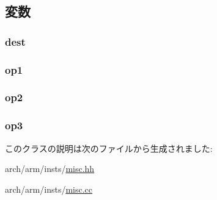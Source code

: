 \subsection{変数}
\hypertarget{classRegRegRegRegOp_aec72e8e45bdc87abeeeb75d2a8a9a716}{
\subsubsection[{dest}]{ {\bf dest}}}
\label{classRegRegRegRegOp_aec72e8e45bdc87abeeeb75d2a8a9a716}
\hypertarget{classRegRegRegRegOp_a4c465c43ad568f8bcf8ae71480e9cfea}{
\subsubsection[{op1}]{ {\bf op1}}}
\label{classRegRegRegRegOp_a4c465c43ad568f8bcf8ae71480e9cfea}
\hypertarget{classRegRegRegRegOp_a7799ff6cbe5a252199059eb8665820e7}{
\subsubsection[{op2}]{ {\bf op2}}}
\label{classRegRegRegRegOp_a7799ff6cbe5a252199059eb8665820e7}
\hypertarget{classRegRegRegRegOp_aeebae963914149e59062881eccc25c48}{
\subsubsection[{op3}]{ {\bf op3}}}
\label{classRegRegRegRegOp_aeebae963914149e59062881eccc25c48}


このクラスの説明は次のファイルから生成されました:\begin{DoxyCompactItemize}
\item 
arch/arm/insts/\hyperlink{arch_2arm_2insts_2misc_8hh}{misc.hh}\item 
arch/arm/insts/\hyperlink{arch_2arm_2insts_2misc_8cc}{misc.cc}\end{DoxyCompactItemize}
